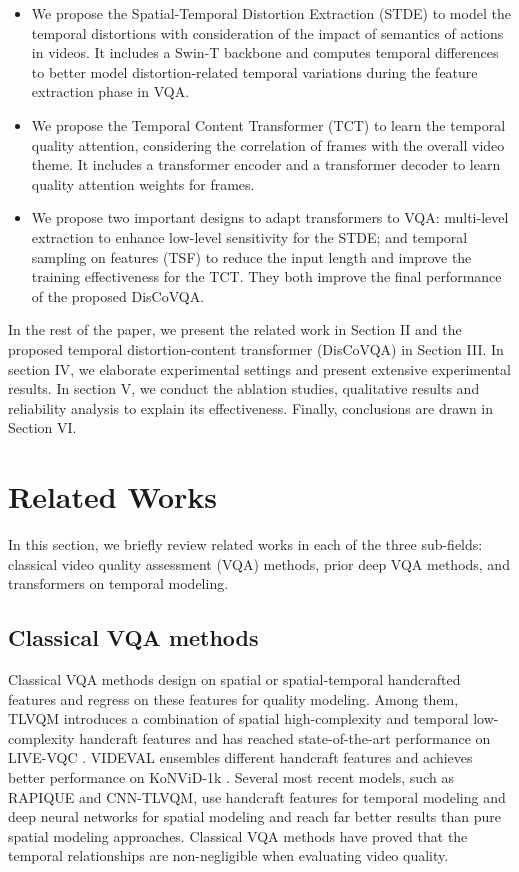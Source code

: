 \documentclass[journal]{IEEEtran}
\begin{document}
\begin{itemize} \item We propose the Spatial-Temporal Distortion Extraction (STDE) to model the temporal distortions with consideration of the impact of semantics of actions in videos. It includes a Swin-T backbone and computes temporal differences to better model distortion-related temporal variations during the feature extraction phase in VQA.
    \item We propose the Temporal Content Transformer (TCT) to learn the temporal quality attention, considering the correlation of frames with the overall video theme. It includes a transformer encoder and a transformer decoder to learn quality attention weights for frames. 
    \item We propose two important designs to adapt transformers to VQA: multi-level extraction to enhance low-level sensitivity for the STDE; and temporal sampling on features (TSF) to reduce the input length and improve the training effectiveness for the TCT. They both improve the final performance of the proposed DisCoVQA.
\end{itemize}

In the rest of the paper, we present the related work in Section II and the proposed temporal distortion-content transformer (DisCoVQA) in Section III. In section IV, we elaborate experimental settings and present extensive experimental results. In section V, we conduct the ablation studies, qualitative results and reliability analysis to explain its effectiveness. Finally, conclusions are drawn in Section VI.





\section{Related Works}
In this section, we briefly review related works in each of the three sub-fields: classical video quality assessment (VQA) methods, prior deep VQA methods, and transformers on temporal modeling.

\subsection{Classical VQA methods}
Classical VQA methods design on spatial \cite{brisque, friquee, hosa} or spatial-temporal \cite{vbliinds, viideo, tlvqm, videval} handcrafted features and regress on these features for quality modeling. Among them, TLVQM \cite{tlvqm} introduces a combination of spatial high-complexity and temporal low-complexity handcraft features and has reached state-of-the-art performance on LIVE-VQC \cite{vqc}. VIDEVAL \cite{videval} ensembles different handcraft features and achieves better performance on KoNViD-1k \cite{kv1k}. Several most recent models, such as RAPIQUE\cite{rapique} and CNN-TLVQM\cite{cnntlvqm}, use handcraft features for temporal modeling and deep neural networks for spatial modeling and reach far better results than pure spatial modeling approaches. Classical VQA methods have proved that the temporal relationships are non-negligible when evaluating video quality.
\end{document}
